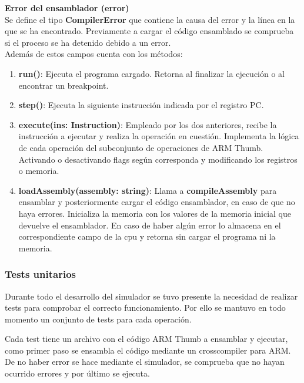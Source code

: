 {        \textbf{Error del ensamblador (error)} \\
        Se define el tipo \textbf{CompilerError} que contiene la causa del error y la línea en la que se ha encontrado.
        Previamente a cargar el código ensamblado se comprueba si el proceso se ha detenido debido a un error. \\

        Además de estos campos cuenta con los métodos:
        \begin{enumerate}
            \item \textbf{run()}: Ejecuta el programa cargado. Retorna al finalizar la ejecución o al encontrar un breakpoint.
            \item \textbf{step()}: Ejecuta la siguiente instrucción indicada por el registro PC.
            \item \textbf{execute(ins: Instruction)}: Empleado por los dos anteriores, recibe la instrucción a ejecutar y realiza la operación en cuestión.
                Implementa la lógica de cada operación del subconjunto de operaciones de ARM Thumb.
                Activando o desactivando flags según corresponda y modificando los registros o memoria.
            \item \textbf{loadAssembly(assembly: string)}: Llama a \textbf{compileAssembly} para ensamblar y posteriormente cargar el código ensamblador, en caso de que no haya errores.
                Inicializa la memoria con los valores de la memoria inicial que devuelve el ensamblador. En caso de haber algún error lo almacena en el correspondiente campo de la cpu
                y retorna sin cargar el programa ni la memoria.
        \end{enumerate}

        \subsubsection{Tests unitarios}
        Durante todo el desarrollo del simulador se tuvo presente la necesidad de realizar tests
        para comprobar el correcto funcionamiento. Por ello se mantuvo en todo momento un conjunto de tests para cada operación.
        
        Cada test tiene un archivo con el código ARM Thumb a ensamblar y ejecutar, como primer paso se ensambla el código
        mediante un crosscompiler para ARM. De no haber error se hace mediante el simulador, se comprueba que no hayan ocurrido errores y por
        último se ejecuta.

}
